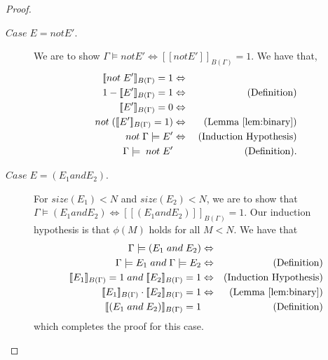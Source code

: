\documentclass[acmsmall,nonacm]{acmart}\settopmatter{printfolios=true,printccs=false,printacmref=false}
\newcommand{\qqpi}[2]{[\![#2]\!]_{#1}}
\begin{document}
\begin{proof}
\begin{description}
     \item[$Case \; E ={} \mathrel{not} E'$.]
                  We are to show
                  $\Gamma \models{} \mathrel{not} E' \Leftrightarrow \qqpi{B(\Gamma)}{\mathrel{not} E'} = 1$.
                  We have that,
                  \begin{align*}
                        \qqpi{B(\Gamma)}{\mathrel{not} E'} = 1 & \Leftrightarrow{} &  \\
                        1- \qqpi{B(\Gamma)}{E'} = 1 & \Leftrightarrow{} & \text{(Definition)}  \\
                        \qqpi{B(\Gamma)}{E'} = 0 & \Leftrightarrow{} &  \\
                        \mathrel{not} (\qqpi{B(\Gamma)}{E'} = 1) & \Leftrightarrow{} & \text{(Lemma~\ref{lem:binary})} \\
                        \mathrel{not}  \Gamma \models{}  E'
                        & \Leftrightarrow{} & \text{(Induction Hypothesis)} \\
                         \Gamma \models{} \mathrel{not} E' & & \text{(Definition)}.
                  \end{align*}
          
          \item[$Case \; E = (E_1 \mathrel{and} E_2)$.] 
                  For $size(E_1)<N$ and $size(E_2) < N$, we are to show that
                  $\Gamma \models (E_1 \mathrel{and} E_2) \Leftrightarrow \qqpi{B(\Gamma)}{(E_1 \mathrel{and} E_2)} = 1$. Our induction hypothesis is that $\phi(M)$ holds for all $M<N$. We have that
                  \begin{align*}
                      \Gamma \models (E_1 \mathrel{and} E_2)                            & \Leftrightarrow &  \\
                      \Gamma \models E_1 \mathrel{and} \Gamma \models E_2               & \Leftrightarrow & \text{(Definition)}  \\
                      \qqpi{B(\Gamma)}{E_1} = 1 \mathrel{and} \qqpi{B(\Gamma)}{E_2} = 1 & \Leftrightarrow & \text{(Induction Hypothesis)}           \\
                      \qqpi{B(\Gamma)}{E_1} \cdot \qqpi{B(\Gamma)}{E_2} = 1             & \Leftrightarrow &  \text{(Lemma~\ref{lem:binary})}           \\                 
                      \qqpi{B(\Gamma)}{(E_1 \mathrel{and} E_2)} = 1                  &   &  \text{(Definition)}                                         \\
                  \end{align*}
                  which completes the proof for this case.


\end{description}
\end{proof}
\end{document}
